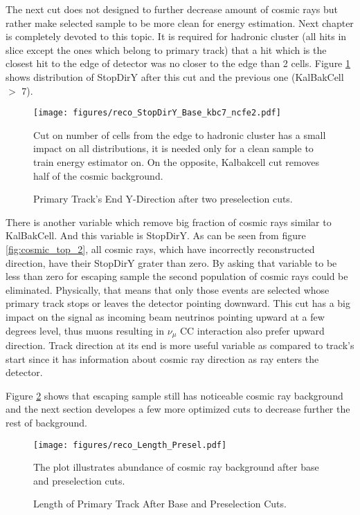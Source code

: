 The next cut does not designed to further decrease amount of cosmic rays but rather make selected sample 
to be more clean for energy estimation. Next chapter is completely devoted to this topic. It is required for 
hadronic cluster (all hits in slice except the ones which belong to primary track) that a hit which is the 
closest hit to the edge of detector was no closer to the edge than 2 cells. Figure \ref{fig:stopdiry_2} shows
distribution of StopDirY after this cut and the previous one (KalBakCell $>$ 7).
\begin{figure}[h]
\centering
\texttt{[image: figures/reco\_StopDirY\_Base\_kbc7\_ncfe2.pdf]}
\caption{Primary Track's End Y-Direction after two preselection cuts.}
{Cut on number of cells from the edge to hadronic cluster has a small impact on all distributions, it is needed
only for a clean sample to train energy estimator on. On the opposite, Kalbakcell cut removes half of the cosmic
background. }
\label{fig:stopdiry_2}
\end{figure} 

There is another variable which remove big fraction of cosmic rays similar to KalBakCell. And this variable 
is StopDirY. As can be seen from figure \ref{fig:cosmic_top_2}, all cosmic rays, which have incorrectly reconstructed
direction, have their StopDirY grater than zero. By asking that variable to be less than zero for escaping 
sample the second population of cosmic rays could be eliminated. Physically, that means that only those events
are selected whose primary track stops or leaves the detector pointing downward. This cut has a big impact
on the signal as incoming beam neutrinos pointing upward at a few degrees level, thus muons resulting in $\nu_\mu$
CC interaction also prefer upward direction. Track direction at its end is more useful variable as compared to
track's start since it has information about cosmic ray direction as ray enters the detector. 

Figure \ref{fig:length_2} shows that escaping sample still has noticeable cosmic ray background and the next 
section developes a few more optimized cuts to decrease further the rest of background.

\begin{figure}[!h]
\centering
\texttt{[image: figures/reco\_Length\_Presel.pdf]}
\caption{Length of Primary Track After Base and Preselection Cuts.}
{The plot illustrates abundance of cosmic ray background after base and preselection cuts. }
\label{fig:length_2}
\end{figure}

